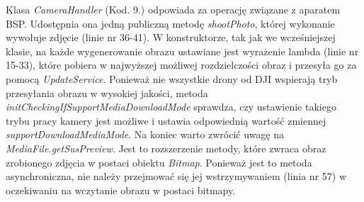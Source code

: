 Klasa \textit{CameraHandler} (Kod. 9.) odpowiada za operację związane z aparatem BSP. Udostępnia ona jedną publiczną metodę \textit{shootPhoto}, której wykonanie wywołuje zdjęcie (linie nr 36-41). W konstruktorze, tak jak we wcześniejszej klasie, na każde wygenerowanie obrazu ustawiane jest wyrażenie lambda (linie nr 15-33), które pobiera w najwyższej możliwej rozdzielczości obraz i przesyła go za pomocą \textit{UpdateService}. Ponieważ nie wszystkie drony od DJI wspierają tryb przesyłania obrazu w wysokiej jakości, metoda \textit{initCheckingIfSupportMediaDownloadMode} sprawdza, czy ustawienie takiego trybu pracy kamery jest możliwe i ustawia odpowiednią wartość zmiennej \textit{supportDownloadMediaMode}. Na koniec warto zwrócić uwagę na \textit{MediaFile.getSusPreview}. Jest to rozszerzenie metody, które zwraca obraz zrobionego zdjęcia w postaci obiektu \textit{Bitmap}. Ponieważ jest to metoda asynchroniczna, nie należy przejmować się jej wstrzymywaniem (linia nr 57) w oczekiwaniu na wczytanie obrazu w postaci bitmapy.
  
